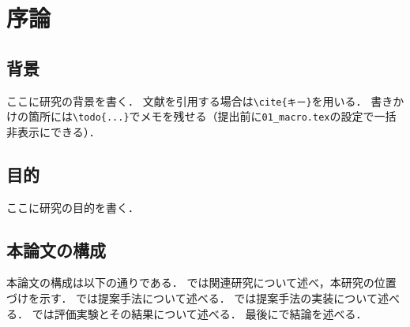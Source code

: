 \chapter{序論}\label{chap:introduction}

\section{背景}\label{sec:background}
ここに研究の背景を書く．
文献を引用する場合は\verb|\cite{キー}|を用いる\cite{sample-book}\cite{sample-web}．
書きかけの箇所には\verb|\todo{...}|でメモを残せる（提出前に\verb|01_macro.tex|の設定で一括非表示にできる）．

\section{目的}\label{sec:purpose}
ここに研究の目的を書く．

\section{本論文の構成}
本論文の構成は以下の通りである．
では関連研究について述べ，本研究の位置づけを示す．
では提案手法について述べる．
では提案手法の実装について述べる．
では評価実験とその結果について述べる．
最後にで結論を述べる．
